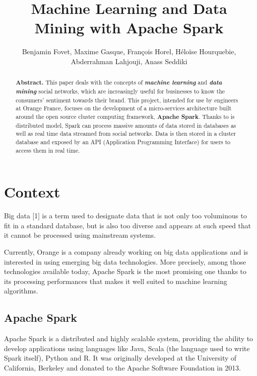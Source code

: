 \documentclass[11pt]{article}
\title{\textbf{Machine Learning and Data Mining with Apache Spark}}
\author{Benjamin Fovet, Maxime Gasque, François Horel, Héloïse Hourquebie, \\Abderrahman Lahjouji, Anass Seddiki}
\affil{\texttt{\{bfovet, mgasque, fhorel, hhourquebie, alahjouji, aseddiki\} \\ \texttt{@enseirb-matmeca.fr}}}
\date{}
\begin{document}
\maketitle

\begin{abstract}
\textbf{Abstract.} This paper deals with the concepts of \textbf{\textit{machine learning}} and \textbf{\textit{data mining}} social networks, which are increasingly useful for businesses to know the consumers' sentiment towards their brand. This project, intended for use by engineers at \textsf{Orange France}, focuses on the development of a micro-services architecture built around the open source cluster computing framework, \textsf{\textbf{Apache Spark}}. Thanks to is distributed model, \textsf{Spark} can process massive amounts of data stored in databases as well as real time data streamed from social networks. Data is then stored in a cluster database and exposed by an API (Application Programming Interface) for users to access them in real time.
\end{abstract}

\section{Context}
Big data [1] is a term used to designate data that is not only too voluminous to fit in a standard database, but is also too diverse and appears at such speed that it cannot be processed using mainstream systems. 
\vskip 9pt

Currently, \textsf{Orange} is a company already working on big data applications and is interested in using emerging big data technologies. More precisely, among those technologies available today, \textsf{Apache Spark} is the most promising one thanks to its processing performances that makes it well suited to machine learning algorithms.

\subsection{Apache Spark}
\label{apache spark}
\textsf{Apache Spark} is a distributed and highly scalable system, providing the ability to develop applications using languages like \textsf{Java}, \textsf{Scala} (the language used to write \textsf{Spark} itself), \textsf{Python} and \textsf{R}. It was originally developed at the University of California, Berkeley and donated to the Apache Software Foundation in 2013.
\end{document}
